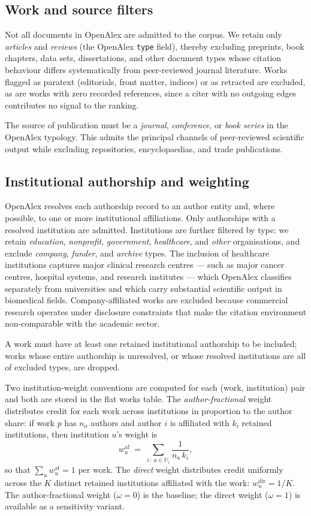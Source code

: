 \subsection{Work and source filters}

Not all documents in OpenAlex are admitted to the corpus.  We retain only
\emph{articles} and \emph{reviews} (the OpenAlex \texttt{type} field), thereby
excluding preprints, book chapters, data sets, dissertations, and other
document types whose citation behaviour differs systematically from peer-reviewed
journal literature.  Works flagged as paratext (editorials, front matter, indices)
or as retracted are excluded, as are works with zero recorded references, since
a citer with no outgoing edges contributes no signal to the ranking.

The source of publication must be a \emph{journal}, \emph{conference}, or
\emph{book series} in the OpenAlex typology.  This admits the principal channels
of peer-reviewed scientific output while excluding repositories, encyclopaedias,
and trade publications.

\subsection{Institutional authorship and weighting}

OpenAlex resolves each authorship record to an author entity and, where
possible, to one or more institutional affiliations.  Only authorships with a
resolved institution are admitted.  Institutions are further filtered by type:
we retain \emph{education}, \emph{nonprofit}, \emph{government},
\emph{healthcare}, and \emph{other} organisations, and exclude
\emph{company}, \emph{funder}, and \emph{archive} types.  The inclusion of
healthcare institutions captures major clinical research centres --- such as
major cancer centres, hospital systems, and research institutes --- which
OpenAlex classifies separately from universities and which carry substantial
scientific output in biomedical fields.  Company-affiliated works are excluded
because commercial research operates under disclosure constraints that make the
citation environment non-comparable with the academic sector.

A work must have at least one retained institutional authorship to be included;
works whose entire authorship is unresolved, or whose resolved institutions are
all of excluded types, are dropped.

Two institution-weight conventions are computed for each (work, institution)
pair and both are stored in the flat works table.  The \emph{author-fractional}
weight distributes credit for each work across institutions in proportion to
the author share: if work $p$ has $n_a$ authors and author $i$ is affiliated
with $k_i$ retained institutions, then institution $u$'s weight is
\[
  w_{u}^{\mathrm{af}} \;=\; \sum_{i\,:\,u \in U_i} \frac{1}{n_a\, k_i},
\]
so that $\sum_u w_u^{\mathrm{af}} = 1$ per work.  The \emph{direct} weight
distributes credit uniformly across the $K$ distinct retained institutions
affiliated with the work: $w_u^{\mathrm{dir}} = 1/K$.  The author-fractional
weight ($\omega = 0$) is the baseline; the direct weight ($\omega = 1$) is
available as a sensitivity variant.

